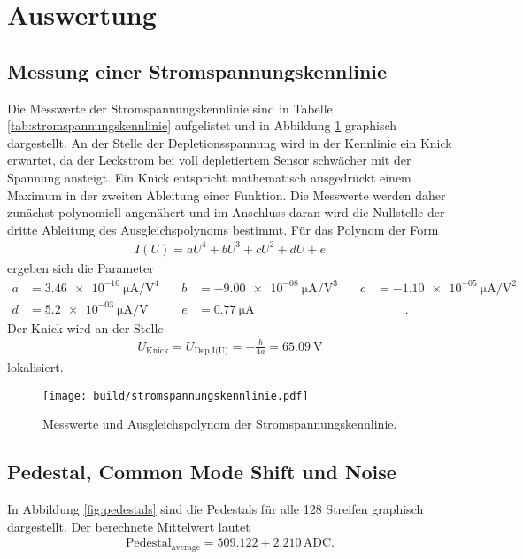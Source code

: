 \section{Auswertung}
\label{sec:Auswertung}

\subsection{Messung einer Stromspannungskennlinie}

Die Messwerte der Stromspannungskennlinie sind in Tabelle \ref{tab:stromspannungskennlinie} aufgelistet
und in Abbildung \ref{fig:stromspannungskennlinie} graphisch dargestellt. An der Stelle der Depletionsspannung
wird in der Kennlinie ein Knick erwartet, da der Leckstrom bei voll depletiertem Sensor schwächer mit der Spannung
ansteigt. Ein Knick entspricht mathematisch ausgedrückt einem Maximum in der zweiten Ableitung einer Funktion.
Die Messwerte werden daher zunächst polynomiell angenähert und im Anschluss daran wird die Nullstelle der dritte Ableitung des
Ausgleichspolynoms bestimmt. Für das Polynom der Form
\begin{align}
  I(U) = a U^4 + b U^3 + c U^2 + d U + e
\end{align}
ergeben sich die Parameter
\begin{align*}
  a &= \SI{3.46e-10}{\micro\ampere\per\volt\tothe{4}} &\quad b &= \SI{-9.00e-08}{\micro\ampere\per\volt\tothe{3}} &\quad c&= \SI{-1.10e-05}{\micro\ampere\per\volt\tothe{2}} \\
  d &= \SI{5.2e-03}{\micro\ampere\per\volt} &\quad e &= \SI{0.77}{\micro\ampere} &\quad \phantom{f}&\phantom{=10}.
\end{align*}
Der Knick wird an der Stelle
\begin{align}
  U_\text{Knick} = U_\text{Dep,I(U)} = -\frac{b}{4a} = \SI{65.09}{\volt}
\end{align}
lokalisiert.

\begin{figure}
  \centering
  \texttt{[image: build/stromspannungskennlinie.pdf]}
  \caption{Messwerte und Ausgleichspolynom der Stromspannungskennlinie.}
  \label{fig:stromspannungskennlinie}
\end{figure}

\subsection{Pedestal, Common Mode Shift und Noise}

In Abbildung \ref{fig:pedestals} sind die Pedestals für alle 128 Streifen graphisch dargestellt.
Der berechnete Mittelwert lautet
\begin{align}
   \text{Pedestal}_\text{average} = 509.122 \pm 2.210 \, \text{ADC}.
\end{align}


